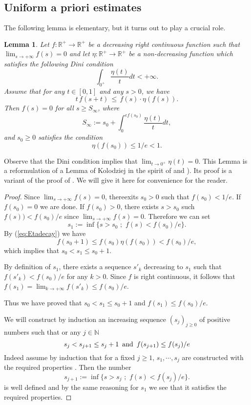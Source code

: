 \documentclass[12pt]{amsart}
\newtheorem{lemma}[theorem]{Lemma}
\theoremstyle{definition}
\numberwithin{theorem}{section}
\numberwithin{equation}{section}
\newcommand{\N}{\mathbb{N}}
\begin{document}
{\subsection{Uniform a priori estimates}
The following lemma is elementary, but it turns out to play a crucial role.
\begin{lemma}\label{lem:Kolo}
Let $f :\mathbb{R^+}\rightarrow\mathbb{R^+}$ be a decreasing right continuous function  such that $\lim_{s \to + \infty} f (s) = 0$ and let $\eta :\mathbb{R^+}\rightarrow\mathbb{R^+}$ be a  non-decreasing function which satisfies the following Dini condition
\begin{equation} \label{eq:DC0}
\int_{0^+} \frac{\eta (t)}{t} d t< + \infty.
\end{equation}
Assume that for any $t \in [0,1]$ and any $s > 0$, we have
\begin{equation} \label{eq:Etadecay}
t \, f (s+t) \, \leq  \,  f (s) \cdot  \eta ( f (s)).
\end{equation}
Then $f (s)=0$ for all $s\geq S_{\infty}$, where 
$$
S_{\infty}:= s_0 + \int_{0}^{ e f (s_0)}  \frac{\eta (t)}{t} d t, 
$$
and $s_0 \geq 0$ satisfies the condition
$$
\eta (f (s_0)) \leq 1 \slash e < 1.
$$
\end{lemma}
Observe that the Dini condition implies that $\lim_{t \to 0^+} \eta (t) = 0$. 
This Lemma is a reformulation of a Lemma of Kolodziej \cite{Kol05} in the spirit of  \cite{EGZ09} and \cite{BGZ08}). Its proof is a variant of the proof of \cite[Lemma 2.4]{EGZ09}. We will give it here for convenience for the reader.
\begin{proof} 
Since $\lim_{s \to + \infty} f(s) = 0$, thereexits $s_0 > 0$ such that $f(s_0) < 1 \slash e$. If $f (s_0) = 0$ we are done. If $f (s_0) > 0$, there exists $s > s_0$ such $f (s)) <   f (s_0) \slash e$ since $\lim_{s \to  + \infty} f (s)  = 0$. Therefore we can set  
$$
s_1 :=  \inf \{ s > s_0  \, \, ; \, \,  f (s) <  f (s_0) \slash e \}.
$$ 
By (\ref{eq:Etadecay}) we have
$$
f (s_0 + 1) \leq f (s_0) \eta (f(s_0)) < f (s_0) \slash e,
$$
which implies that $s_0 < s_1 \leq s_0 + 1$.

By definition of $s_1$,  there exists a sequence $s'_k$ decreasing to $s_1$ such that $ f (s'_k) <  f (s_0) \slash e$ for any $k > 0$. Since $f$ is right continuous, it follows that $f (s_1) = \lim_{k \to + \infty} f (s'_k) \leq f (s_0) \slash e$.

Thus we have proved that $s_0 < s_1 \leq s_0 + 1$ and $f (s_1) \leq f (s_0) \slash e$.

 We will construct  by induction an increasing  sequence $(s_j)_{j \geq 0}$ of positive numbers such that or any $j \in \N$
 $$
 s_j < s_{j + 1} \leq s_j + 1 \, \, \, \hbox{and} \, \, \, f (s_{j + 1} )\leq f (s_j) \slash e
 $$
Indeed assume by induction that for a fixed $j \geq 1$,   $s_1, \cdots, s_j$ are constructed with the required properties . Then the number 
$$
s_{j + 1} :=  \inf \{ s > s_j \, \, ; \, \,  f (s) <  f (s_j) \slash e \}.
$$
is well defined and by the same reasoning for $s_1$ we see that it satisfies the required properties. 


\end{proof}}
\end{document}
